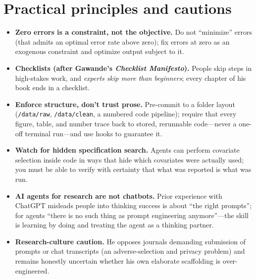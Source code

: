 \documentclass[11pt]{article}
\begin{document}
\section{Practical principles and cautions}
\begin{itemize}
  \item \textbf{Zero errors is a constraint, not the objective.} Do not
  ``minimize'' errors (that admits an optimal error rate above zero); fix errors
  at zero as an exogenous constraint and optimize output subject to it.
  \item \textbf{Checklists (after Gawande's \emph{Checklist Manifesto}).} People
  skip steps in high-stakes work, and \emph{experts skip more than beginners};
  every chapter of his book ends in a checklist.
  \item \textbf{Enforce structure, don't trust prose.} Pre-commit to a folder
  layout (\texttt{/data/raw}, \texttt{/data/clean}, a numbered code pipeline);
  require that every figure, table, and number trace back to stored, rerunnable
  code---never a one-off terminal run---and use hooks to guarantee it.
  \item \textbf{Watch for hidden specification search.} Agents can perform
  covariate selection inside code in ways that hide which covariates were
  actually used; you must be able to verify with certainty that what was reported
  is what was run.
  \item \textbf{AI agents for research are not chatbots.} Prior experience with
  ChatGPT misleads people into thinking success is about ``the right prompts'';
  for agents ``there is no such thing as prompt engineering anymore''---the skill
  is learning by doing and treating the agent as a thinking partner.
  \item \textbf{Research-culture caution.} He opposes journals demanding
  submission of prompts or chat transcripts (an adverse-selection and
  privacy problem) and remains honestly uncertain whether his own elaborate
  scaffolding is over-engineered.
\end{itemize}
\end{document}
